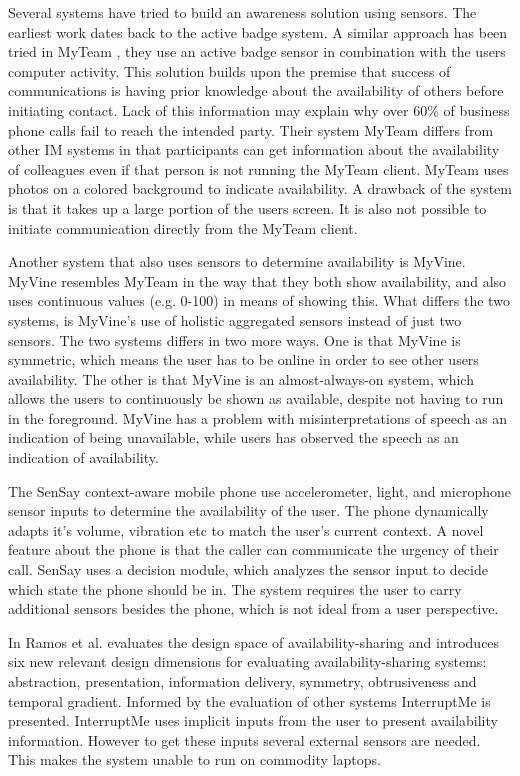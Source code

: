 \documentclass{sigchi}
\begin{document}
Several systems have tried to build an awareness solution using sensors. The earliest work dates back to the active badge system\cite{want1992active}. A similar approach has been tried in MyTeam \cite{lai2003myteam}, they use an active badge sensor in combination with the users computer activity. This solution builds upon the premise that success of communications is having prior knowledge about the availability of others before initiating contact. Lack of this information may explain why over 60\% of business phone calls fail to reach the intended party\cite{whittaker1995rethinking}.
Their system MyTeam differs from other IM systems in that participants can get information about the availability of colleagues even if that person is not running the MyTeam client. MyTeam uses photos on a colored background to indicate availability. A drawback of the system is that it takes up a large portion of the users screen. It is also not possible to initiate communication directly from the MyTeam client.

Another system that also uses sensors to determine availability is MyVine. MyVine resembles MyTeam in the way that they both show availability, and also uses continuous values (e.g. 0-100) in means of showing this. What differs the two systems, is MyVine’s use of holistic aggregated sensors instead of just two sensors. The two systems differs in two more ways. One is that MyVine is symmetric, which means the user has to be online in order to see other users availability. The other is that MyVine is an almost-always-on system, which allows the users to continuously be shown as available, despite not having to run in the foreground.
MyVine has a problem with misinterpretations of speech as an indication of being unavailable, while users has observed the speech as an indication of availability.

The SenSay context-aware mobile phone\cite{siewiorek2003sensay} use accelerometer, light, and microphone sensor inputs to determine the availability of the user. The phone dynamically adapts it’s volume, vibration etc to match the user's current context. A novel feature about the phone is that the caller can communicate the urgency of their call. SenSay uses a decision module, which analyzes the sensor input to decide which state the phone should be in. The system requires the user to carry additional sensors besides the phone, which is not ideal from a user perspective.

In \cite{Ramos2011} Ramos et al. evaluates the design space of availability-sharing and introduces six new relevant design dimensions for evaluating availability-sharing systems: abstraction, presentation, information delivery, symmetry, obtrusiveness and temporal gradient. Informed by the evaluation of other systems InterruptMe is presented. InterruptMe uses implicit inputs from the user to present availability information. However to get these inputs several external sensors are needed. This makes the system unable to run on commodity laptops.
\end{document}
